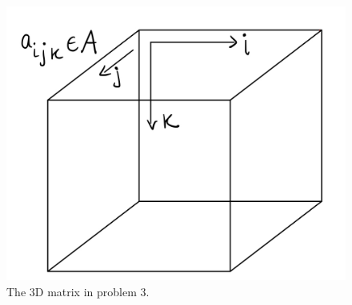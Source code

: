 \documentclass[12pt]{article}
\theoremstyle{definition}
\theoremstyle{remark}
\begin{document}
\begin{enumerate}
\begin{enumerate}
\newpage 
\begin{figure}
\label{matrix}
    \centering
    \includegraphics[scale=0.20]{3dmatrix.jpg}
    \caption{The 3D matrix in problem 3.}
\end{figure}

\end{enumerate}
\end{enumerate}
\end{document}
